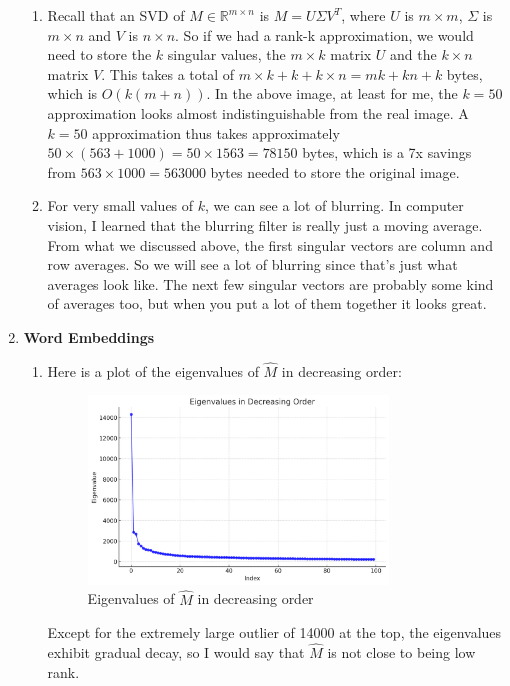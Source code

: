 \documentclass[12pt]{article}
\theoremstyle{definitionstyle}
\def\mbb#1{\mathbb{#1}}
\def \R{\mbb{R}}
\begin{document}
\begin{enumerate}[leftmargin=\labelsep]
\begin{enumerate}[label=\textbf{(\alph*)}]
            \item Recall that an SVD of $M \in \R^{m \times n}$ is $M = U \Sigma V^T$, where $U$ is $m \times m$, $\Sigma$ is $m \times n$ and $V$ is $n \times n$. So if we had a rank-k approximation, we would need to store the $k$ singular values, the $m \times k$ matrix $U$ and the $k \times n$ matrix $V$. This takes a total of $m \times k + k + k \times n = mk + kn + k$ bytes, which is $O(k(m+n))$. In the above image, at least for me, the $k=50$ approximation looks almost indistinguishable from the real image. A $k=50$ approximation thus takes approximately $50 \times (563 + 1000) = 50 \times 1563 = 78150$ bytes, which is a 7x savings from $563 \times 1000 = 563000$ bytes needed to store the original image.
    
            \item For very small values of $k$, we can see a lot of blurring. In computer vision, I learned that the blurring filter is really just a moving average. From what we discussed above, the first singular vectors are column and row averages. So we will see a lot of blurring since that's just what averages look like. The next few singular vectors are probably some kind of averages too, but when you put a lot of them together it looks great.
        \end{enumerate}
        \item \textbf{Word Embeddings}
        \begin{enumerate}[label=\textbf{(\alph*)}]
            \item Here is a plot of the eigenvalues of $\hat M$ in decreasing order:
            \begin{figure}[H]
                \centering
                \includegraphics[width=0.8\textwidth]{eigvals_dec_order.png}
                \caption{Eigenvalues of $\hat M$ in decreasing order}
            \end{figure}
            Except for the extremely large outlier of 14000 at the top, the eigenvalues exhibit gradual decay, so I would say that $\hat M$ is not close to being low rank.


\end{enumerate}
\end{enumerate}
\end{document}
